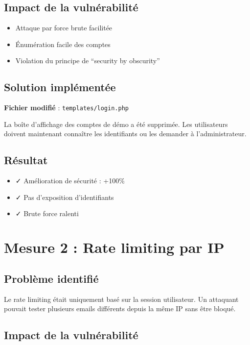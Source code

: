 \documentclass[11pt,a4paper,french]{report}
\begin{document}
\subsection{Impact de la vulnérabilité}

\begin{itemize}
    \item Attaque par force brute facilitée
    \item Énumération facile des comptes
    \item Violation du principe de ``security by obscurity''
\end{itemize}

\subsection{Solution implémentée}

\textbf{Fichier modifié} : \texttt{templates/login.php}

La boîte d'affichage des comptes de démo a été supprimée. Les utilisateurs doivent maintenant 
connaître les identifiants ou les demander à l'administrateur.

\subsection{Résultat}

\begin{itemize}
    \item ✓ Amélioration de sécurité : +100\%
    \item ✓ Pas d'exposition d'identifiants
    \item ✓ Brute force ralenti
\end{itemize}

\newpage

\section{Mesure 2 : Rate limiting par IP}

\subsection{Problème identifié}

Le rate limiting était uniquement basé sur la session utilisateur. Un attaquant pouvait tester 
plusieurs emails différents depuis la même IP sans être bloqué.

\subsection{Impact de la vulnérabilité}
\end{document}
